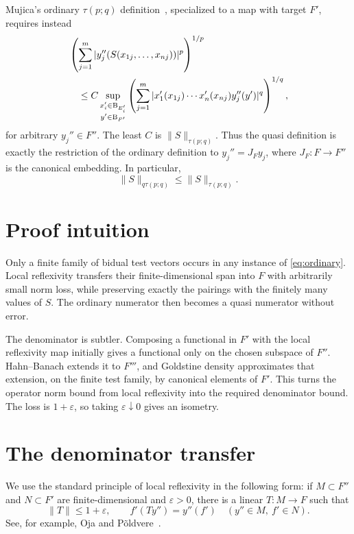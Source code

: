 \documentclass[11pt]{article}
\newcommand{\B}{\mathrm B}
\begin{document}
Mujica's ordinary $\tau(p;q)$ definition~\cite[Definition 3.2]{Mujica08},
specialized to a map with target $F'$, requires instead
\begin{align}
 &\left(\sum_{j=1}^m
 |y_j''(S(x_{1j},\ldots,x_{nj}))|^p\right)^{1/p} \notag\\
 &\quad\le C\sup_{\substack{x_i'\in\B_{E_i'}\\y'\in\B_{F'}}}
 \left(\sum_{j=1}^m
 |x_1'(x_{1j})\cdots x_n'(x_{nj})y_j''(y')|^q\right)^{1/q},
 \label{eq:ordinary}
\end{align}
for arbitrary $y_j''\in F''$.  The least $C$ is
$\|S\|_{\tau(p;q)}$.  Thus the quasi definition is exactly the restriction of
the ordinary definition to $y_j''=J_Fy_j$, where $J_F:F\to F''$ is the
canonical embedding.  In particular,
\begin{equation}
 \|S\|_{q\tau(p;q)}\le \|S\|_{\tau(p;q)}.
 \label{eq:easy}
\end{equation}

\section{Proof intuition}

Only a finite family of bidual test vectors occurs in any instance of
\eqref{eq:ordinary}.  Local reflexivity transfers their finite-dimensional
span into $F$ with arbitrarily small norm loss, while preserving exactly the
pairings with the finitely many values of $S$.  The ordinary numerator then
becomes a quasi numerator without error.

The denominator is subtler.  Composing a functional in $F'$ with the local
reflexivity map initially gives a functional only on the chosen subspace of
$F''$.  Hahn--Banach extends it to $F'''$, and Goldstine density approximates
that extension, on the finite test family, by canonical elements of $F'$.
This turns the operator norm bound from local reflexivity into the required
denominator bound.  The loss is $1+\varepsilon$, so taking
$\varepsilon\downarrow0$ gives an isometry.

\section{The denominator transfer}

We use the standard principle of local reflexivity in the following form:
if $M\subset F''$ and $N\subset F'$ are finite-dimensional and
$\varepsilon>0$, there is a linear $T:M\to F$ such that
\begin{equation}
 \|T\|\le1+\varepsilon,
 \qquad f'(Ty'')=y''(f')\quad(y''\in M,\ f'\in N).
 \label{eq:plr}
\end{equation}
See, for example, Oja and P\~oldvere~\cite{OP07}.
\end{document}
